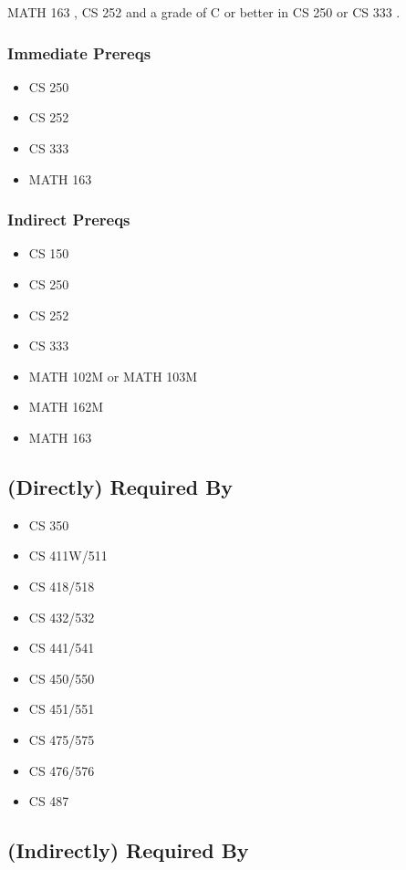 \documentclass[]{article}
\providecommand{\tightlist}{%
  \setlength{\itemsep}{0pt}\setlength{\parskip}{0pt}}
\begin{document}
MATH 163 , CS 252 and a grade of C or better in CS 250 or CS 333 .

\subsubsection{Immediate Prereqs}\label{immediate-prereqs-9}

\begin{itemize}
\tightlist
\item
  CS 250
\item
  CS 252
\item
  CS 333
\item
  MATH 163
\end{itemize}

\subsubsection{Indirect Prereqs}\label{indirect-prereqs-9}

\begin{itemize}
\tightlist
\item
  CS 150
\item
  CS 250
\item
  CS 252
\item
  CS 333
\item
  MATH 102M or MATH 103M
\item
  MATH 162M
\item
  MATH 163
\end{itemize}

\subsection{(Directly) Required By}\label{directly-required-by-7}

\begin{itemize}
\tightlist
\item
  CS 350
\item
  CS 411W/511
\item
  CS 418/518
\item
  CS 432/532
\item
  CS 441/541
\item
  CS 450/550
\item
  CS 451/551
\item
  CS 475/575
\item
  CS 476/576
\item
  CS 487
\end{itemize}

\subsection{(Indirectly) Required By}\label{indirectly-required-by-7}
\end{document}
